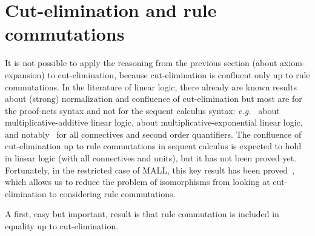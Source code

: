 \documentclass{lmcs}
\newcommand*{\eg}{\emph{e.g.}}
\begin{document}

\section{Cut-elimination and rule commutations}
\label{subsec:gen_eqc}

It is not possible to apply the reasoning from the previous section (about axiom-expansion) to cut-elimination, because cut-elimination is confluent only up to rule commutations.
In the literature of linear logic, there already are known results about (strong) normalization and confluence of cut-elimination but most are for the proof-nets syntax and not for the sequent calculus syntax: \eg~\cite{mallpnlong,allpnbox1,allpnbox2,cutelimmallpn} about multiplicative-additive linear logic, \cite{llsnaccattoli,stnormpnmodstrcong} about multiplicative-exponential linear logic, and notably~\cite{snll} for all connectives and second order quantifiers.
The confluence of cut-elimination up to rule commutations in sequent calculus is expected to hold in linear logic (with all connectives and units), but it has not been proved yet.
Fortunately, in the restricted case of MALL, this key result has been proved~\cite[Theorem~5.1]{calculusformall}, which allows us to reduce the problem of isomorphisms from looking at cut-elimination to considering rule commutations.

A first, easy but important, result is that rule commutation is included in equality up to cut-elimination.
\end{document}
